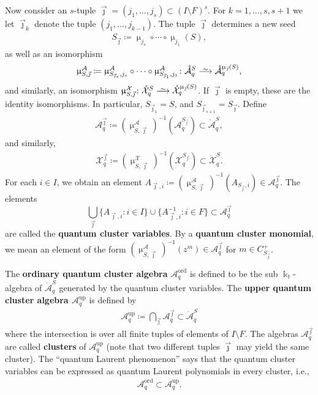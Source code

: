 \documentclass{amsart}
\DeclareMathOperator{\up}{up}
\DeclareMathOperator{\ord}{ord}
\let\s=\mathcal
\let\mr=\mathring
\def\risom{\buildrel\sim\over{\smashedlongrightarrow}}
\def\smashedlongrightarrow{\setbox0=\hbox{$\longrightarrow$}\ht0=1.25pt\box0}
\newcommand {\kk} {\Bbbk}
\newcommand {\kt} {\kk_t}
\newcommand {\jj} {\vec{\jmath}}
\renewcommand{\mu}{\upmu}
\theoremstyle{plain}%
\theoremstyle{definition}
\theoremstyle{remark}
\begin{document}
Now consider an $s$-tuple $\jj=(j_1,\ldots,j_s)\subset (I\setminus F)^s$.  For $k=1,\ldots,s,s+1$ we let $\jj_k$ denote the tuple $(j_1,\ldots,j_{k-1})$.  The tuple $\jj$ determines a new seed 
\begin{align}\label{Sjj}
S_{\jj}\coloneqq \mu_{j_s}\circ \cdots \circ \mu_{j_1}(S),    
\end{align}
as well as an isomorphism $$\mu_{S,\jj}^{\s{A}}\coloneqq \mu_{{S_{\jj_s},}j_s}^{\s{A}}\circ \cdots \circ \mu_{{S_{\jj_1},}j_1}^{\s{A}}\colon \mr{\s{A}}_q^S \risom \mr{\s{A}}^{\mu_{\jj}(S)}_q,$$ 
and similarly, an isomorphism $\mu_{{S},\jj}^{\s{X}}\colon \mr{\s{X}}_q^S \risom \mr{\s{X}}^{\mu_{\jj}(S)}_q$.  If $\jj$ is empty, these are the identity isomorphisms.  In particular, $S_{\jj_1}=S$, and $S_{\jj_{s+1}}=S_{\jj}$.  Define
\begin{align*}
    \s{A}^{\jj}_q\coloneqq (\mu_{{S},\jj}^{\s{A}})^{-1}(\s{A}_q^{S_{\jj}}) \subset \mr{\s{A}}_q^S,
\end{align*}
and similarly,
\begin{align*}
    \s{X}^{\jj}_q\coloneqq (\mu_{{S},\jj}^{\s{X}})^{-1}(\s{X}_q^{S_{\jj}}) \subset \mr{\s{X}}_q^S.
\end{align*}
For each $i\in I$, we obtain an element $A_{\jj,i}\coloneqq (\mu_{{S},\jj}^{\s{A}})^{-1}(A_{S_{\jj},i})\in \s{A}^{\jj}_q$.  The elements $$\bigcup_{\jj} \{A_{\jj,i}\colon i\in I\}\cup \{A_{\jj,i}^{-1}\colon i\in F\}\subset \s{A}^{\jj}_q$$ are called the \textbf{quantum cluster variables}.  By a \textbf{quantum cluster monomial}, we mean an element of the form $(\mu_{{S},\jj}^{\s{A}})^{-1}(z^m)\in \s{A}^{\jj}_q$ for $m\in C_{S_{\jj}}^+$.



The \textbf{ordinary quantum cluster algebra} $\s{A}_q^{\ord}$ is defined to be the sub $\kt$-algebra of $\mr{\s{A}}_q^S$ generated by the quantum cluster variables.  The \textbf{upper quantum cluster algebra $\s{A}_q^{\up}$} is defined by
\begin{align*}
    \s{A}_q^{\up} \coloneqq  \bigcap_{\jj} \s{A}^{\jj}_q \subset \mr{\s{A}}_q^S
\end{align*}
where the intersection is over all finite tuples of elements of $I \setminus F$.  The algebras $\s{A}^{\jj}_q$ are called \textbf{clusters} of $\s{A}_q^{\up}$ (note that two different tuples $\jj$ may yield the same cluster). 
The ``quantum Laurent phenomenon'' \cite[Cor. 5.2]{BZ} says that the quantum cluster variables can be expressed as quantum Laurent polynomials in every cluster, i.e.,
\begin{align}\label{qLaurentPhen}
    \s{A}_q^{\ord}\subset \s{A}_q^{\up}.
\end{align}
\end{document}
